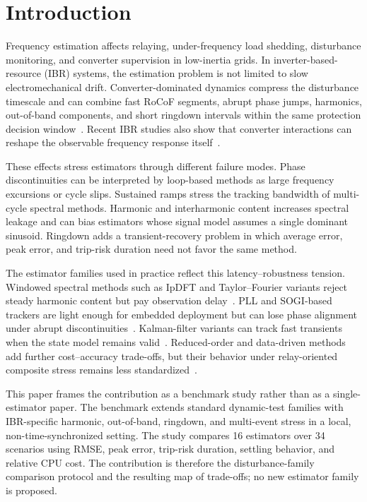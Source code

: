 \section{Introduction}\label{sec:introduction}

Frequency estimation affects relaying, under-frequency load shedding,
disturbance monitoring, and converter supervision in low-inertia grids. In
inverter-based-resource (IBR) systems, the estimation problem is not limited
to slow electromechanical drift. Converter-dominated dynamics compress the
disturbance timescale and can combine fast RoCoF segments, abrupt phase jumps,
harmonics, out-of-band components, and short ringdown intervals within the
same protection decision window~\cite{Milano2018LowInertia,Pinheiro2025,Ponce2025}.
Recent IBR studies also show that converter interactions can reshape the
observable frequency response itself~\cite{Bernal2025,Zoghby2024}.

These effects stress estimators through different failure modes. Phase
discontinuities can be interpreted by loop-based methods as large frequency
excursions or cycle slips. Sustained ramps stress the tracking bandwidth of
multi-cycle spectral methods. Harmonic and interharmonic content increases
spectral leakage and can bias estimators whose signal model assumes a single
dominant sinusoid. Ringdown adds a transient-recovery problem in which average
error, peak error, and trip-risk duration need not favor the same method.

The estimator families used in practice reflect this latency--robustness
tension. Windowed spectral methods such as IpDFT and Taylor--Fourier variants
reject steady harmonic content but pay observation delay~\cite{Belega2014,PlatasGarza2011}.
PLL and SOGI-based trackers are light enough for embedded deployment but can
lose phase alignment under abrupt discontinuities~\cite{Golestan2017,Wright2019}.
Kalman-filter variants can track fast transients when the state model remains
valid~\cite{Ferrero2020EKF,Chamorro2021}. Reduced-order and data-driven methods
add further cost--accuracy trade-offs, but their behavior under
relay-oriented composite stress remains less standardized~\cite{Netto2018KoopmanKF,Ting2022}.

This paper frames the contribution as a benchmark study rather than as a
single-estimator paper. The benchmark extends standard dynamic-test families
with IBR-specific harmonic, out-of-band, ringdown, and multi-event stress in a
local, non-time-synchronized setting. The study compares 16 estimators over 34
scenarios using RMSE, peak error, trip-risk duration, settling behavior, and
relative CPU cost. The contribution is therefore the disturbance-family
comparison protocol and the resulting map of trade-offs; no new estimator
family is proposed.
